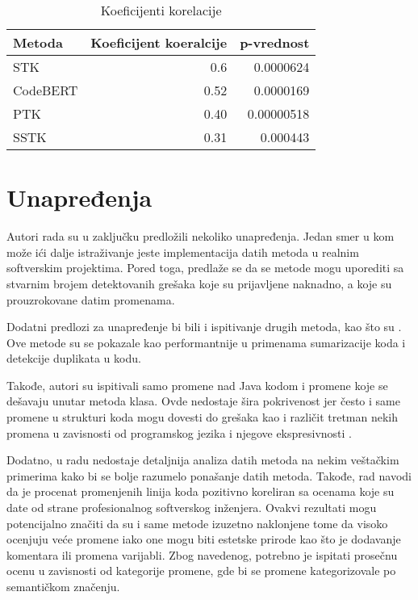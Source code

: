 \documentclass[twocolumns]{article}
\begin{document}
\begin{table}
  \begin{tabular}{l|r|r}
    Metoda & Koeficijent koeralcije & p-vrednost \\
    \hline
    STK        & 0.6 &0.0000624 \\
    CodeBERT   & 0.52&0.0000169 \\
    PTK        & 0.40    & 0.00000518         \\
    SSTK   &   0.31  & 0.000443         \\
    \hline
  \end{tabular}
  \label{fig:table1}
  \caption{Koeficijenti korelacije}
\end{table}



\section{Unapređenja}
\label{sec:improvements}

Autori rada su u zaključku predložili nekoliko unapređenja. Jedan smer u kom može ići dalje istraživanje jeste implementacija datih metoda u realnim softverskim projektima. Pored toga, predlaže se da se metode mogu uporediti sa stvarnim brojem detektovanih grešaka koje su prijavljene naknadno, a koje su prouzrokovane datim promenama. 

Dodatni predlozi za unapređenje bi bili i ispitivanje drugih metoda, kao što su \cite{guo2020graphcodebert,ligraphplbart,hoang2020cc2vec}. Ove metode su se pokazale kao performantnije u primenama sumarizacije koda i detekcije duplikata u kodu. 

Takođe, autori su ispitivali samo promene nad Java kodom i promene koje se dešavaju unutar metoda klasa. Ovde nedostaje šira pokrivenost jer često i same promene u strukturi koda mogu dovesti do grešaka kao i različit tretman nekih promena u zavisnosti od programskog jezika i njegove ekspresivnosti \cite{torley2008expressiveness}. 

Dodatno, u radu nedostaje detaljnija analiza datih metoda na nekim veštačkim primerima kako bi se bolje razumelo ponašanje datih metoda. Takođe, rad navodi da je procenat promenjenih linija koda pozitivno koreliran sa ocenama koje su date od strane profesionalnog softverskog inženjera. Ovakvi rezultati mogu potencijalno značiti da su i same metode izuzetno naklonjene tome da visoko ocenjuju veće promene iako one mogu biti estetske prirode kao što je dodavanje komentara ili promena varijabli. Zbog navedenog, potrebno je ispitati prosečnu ocenu u zavisnosti od kategorije promene, gde bi se promene kategorizovale po semantičkom značenju. 
\end{document}
